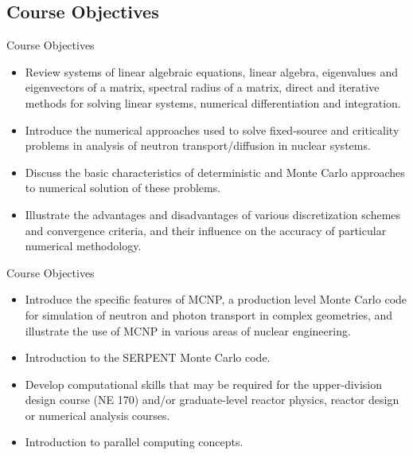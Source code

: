 \documentclass[xcolor=x11names,compress]{beamer}
\renewcommand{\(}{\begin{columns}}
\renewcommand{\)}{\end{columns}}
\newcommand{\<}[1]{\begin{column}{#1}}
\renewcommand{\>}{\end{column}}
\begin{document}
\subsection{Course Objectives}
\begin{frame}{Course Objectives}
\begin{itemize}
\item Review systems of linear algebraic equations, linear algebra, eigenvalues and eigenvectors of a matrix, spectral radius of a matrix, direct and iterative methods for solving linear systems, numerical differentiation and integration.
\item Introduce the numerical approaches used to solve fixed-source and criticality problems in analysis of neutron transport/diffusion in nuclear systems.
\item Discuss the basic characteristics of deterministic and Monte Carlo approaches to numerical solution of these problems.
\item Illustrate the advantages and disadvantages of various discretization schemes and convergence criteria, and their influence on the accuracy of particular numerical methodology.
\end{itemize}
\end{frame}

\begin{frame}{Course Objectives}
\begin{itemize}
\item Introduce the specific features of MCNP, a production level Monte Carlo code for simulation of neutron and photon transport in complex geometries, and illustrate the use of MCNP in various areas of nuclear engineering.
\item Introduction to the SERPENT Monte Carlo code.
\item Develop computational skills that may be required for the upper-division design course (NE 170) and/or graduate-level reactor physics, reactor design or numerical analysis courses.
\item Introduction to parallel computing concepts.
\end{itemize}
\end{frame}

\end{document}
